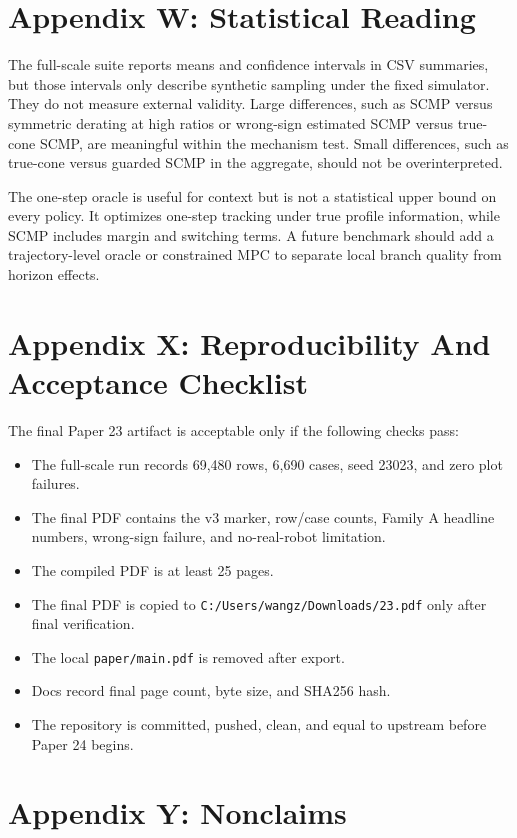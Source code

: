 \documentclass{article}
\begin{document}
\section{Appendix W: Statistical Reading}

The full-scale suite reports means and confidence intervals in CSV summaries, but those intervals only describe synthetic sampling under the fixed simulator. They do not measure external validity. Large differences, such as SCMP versus symmetric derating at high ratios or wrong-sign estimated SCMP versus true-cone SCMP, are meaningful within the mechanism test. Small differences, such as true-cone versus guarded SCMP in the aggregate, should not be overinterpreted.

The one-step oracle is useful for context but is not a statistical upper bound on every policy. It optimizes one-step tracking under true profile information, while SCMP includes margin and switching terms. A future benchmark should add a trajectory-level oracle or constrained MPC to separate local branch quality from horizon effects.

\section{Appendix X: Reproducibility And Acceptance Checklist}

The final Paper 23 artifact is acceptable only if the following checks pass:
\begin{itemize}
\item The full-scale run records 69,480 rows, 6,690 cases, seed 23023, and zero plot failures.
\item The final PDF contains the v3 marker, row/case counts, Family A headline numbers, wrong-sign failure, and no-real-robot limitation.
\item The compiled PDF is at least 25 pages.
\item The final PDF is copied to \texttt{C:/Users/wangz/Downloads/23.pdf} only after final verification.
\item The local \texttt{paper/main.pdf} is removed after export.
\item Docs record final page count, byte size, and SHA256 hash.
\item The repository is committed, pushed, clean, and equal to upstream before Paper 24 begins.
\end{itemize}

\section{Appendix Y: Nonclaims}
\end{document}
